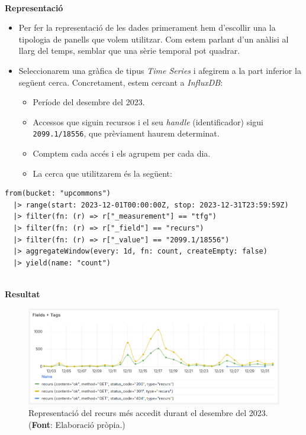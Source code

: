 \clearpage

\noindent \\
\textbf{Representació}

\begin{itemize}
    \item Per fer la representació de les dades primerament hem d’escollir una la tipologia de panells que volem utilitzar. Com estem parlant d’un anàlisi al llarg del temps, semblar que una sèrie temporal pot quadrar.

    \item Seleccionarem una gràfica de tipus \textit{Time Series} i afegirem a la part inferior la següent cerca.
    Concretament, estem cercant a \textit{InfluxDB}:
    \begin{itemize}
        \item Període del desembre del 2023.
        \item Accessos que siguin recursos i el seu \textit{\gls{handle}} (identificador) sigui \texttt{2099.1/18556}, que prèviament haurem determinat.
        \item Comptem cada accés i els agrupem per cada dia.
        \item La cerca que utilitzarem és la següent:
    \end{itemize}
\end{itemize}

\noindent
\begin{verbatim}
from(bucket: "upcommons")
  |> range(start: 2023-12-01T00:00:00Z, stop: 2023-12-31T23:59:59Z)
  |> filter(fn: (r) => r["_measurement"] == "tfg")
  |> filter(fn: (r) => r["_field"] == "recurs")
  |> filter(fn: (r) => r["_value"] == "2099.1/18556")
  |> aggregateWindow(every: 1d, fn: count, createEmpty: false)
  |> yield(name: "count")
\end{verbatim}

\clearpage

\noindent \\
\textbf{Resultat}

\begin{figure}[htbp]
    \centerline{\includegraphics[width=1.2\textwidth]{figures/most-accessed-resource}}
    \captionsetup{justification=centering}
    \caption[Representació del recurs més accedit durant el desembre del 2023.]{Representació del recurs més accedit durant el desembre del 2023. (\textbf{Font}: Elaboració pròpia.)}\label{fig:most-accessed-resource}
\end{figure}


